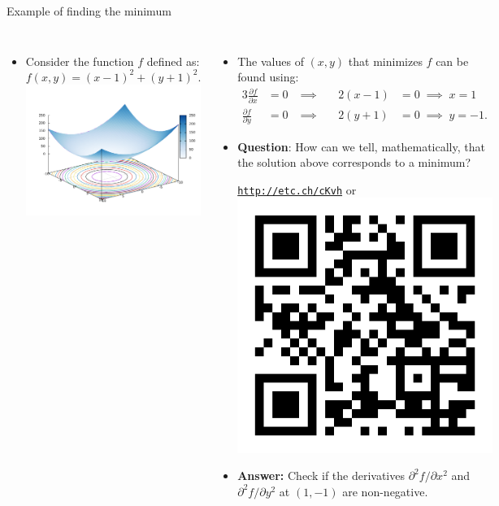 \begin{frame}{Example of finding the minimum}
\small
\begin{columns}[t]
	
\vskip 20pt
\begin{itemize}
\item Consider the function $f$ defined as:
\[
f(x,y)=(x-1)^{2}+(y+1)^{2}.
\]
\vskip -5pt
\includegraphics[width=1\columnwidth]{figures/numerical-methods-chemical-equilibrium/parabolic-plot}
\end{itemize}

\vskip -10pt
\pause
\begin{itemize}
\item The values of $(x,y)$ that minimizes $f$ can be found using:
\begin{alignat*}{3}
\frac{\partial f}{\partial x} & =0 \; & \implies & \; & 2(x-1) & = 0 \; \implies  \; x = 1\\
\frac{\partial f}{\partial y} & =0 & \implies &  & 2(y+1) & =0 \; \implies  \; y = -1.
\end{alignat*}
\pause
\item \alert{\textbf{Question}}: How can we tell, mathematically, that the solution
above corresponds to a minimum?
\begin{center}
	\href{http://etc.ch/cKvh}{\textcolor{indigo(dye)}{\tt http://etc.ch/cKvh}} \quad or \quad 
	\includegraphics[height=0.15\columnwidth]{figures/numerical-methods-chemical-equilibrium/polls.png}
\end{center}
\hiddenpause
\vskip 5pt
\item \textbf{Answer:} Check if the derivatives $\partial^{2}f/\partial x^{2}$
and $\partial^{2}f/\partial y^{2}$ at $(1,-1)$ are non-negative.
\end{itemize}
\end{columns}
\end{frame}
